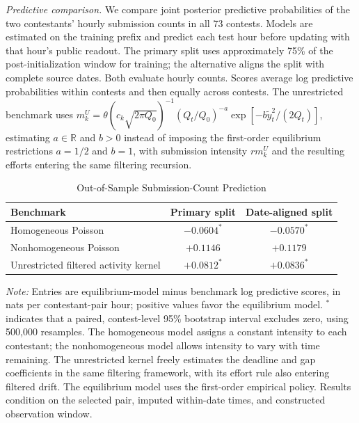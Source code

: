 \documentclass[mnsc]{informs3}
\begin{document}
\begin{APPENDICES}
\textit{Predictive comparison.} We compare joint posterior predictive probabilities of the two contestants' hourly submission counts in all 73 contests. Models are estimated on the training prefix and predict each test hour before updating with that hour's public readout. The primary split uses approximately 75\% of the post-initialization window for training; the alternative aligns the split with complete source dates. Both evaluate hourly counts. Scores average log predictive probabilities within contests and then equally across contests.
The unrestricted benchmark uses $m_k^{U}=\theta(c_k\sqrt{2\pi Q_0})^{-1}(Q_t/Q_0)^{-a}\exp[-b\tilde y_t^2/(2Q_t)]$, estimating $a\in\mathbb R$ and $b>0$ instead of imposing the first-order equilibrium restrictions $a=1/2$ and $b=1$, with submission intensity $rm_k^{U}$ and the resulting efforts entering the same filtering recursion.

\begin{table}[!htbp]
\centering
\caption{Out-of-Sample Submission-Count Prediction}
\label{tab-submission-prediction}
\small
\begin{tabular}{lcc}
\toprule
Benchmark & Primary split & Date-aligned split\\
\midrule
Homogeneous Poisson & $-0.0604^{*}$ & $-0.0570^{*}$\\
Nonhomogeneous Poisson & $+0.1146$ & $+0.1179$\\
Unrestricted filtered activity kernel & $+0.0812^{*}$ & $+0.0836^{*}$\\
\bottomrule
\end{tabular}
\par\vspace{0.5ex}
\begin{minipage}{\textwidth}
\footnotesize\textit{Note:} Entries are equilibrium-model minus benchmark log predictive scores, in nats per contestant-pair hour; positive values favor the equilibrium model. $^{*}$ indicates that a paired, contest-level 95\% bootstrap interval excludes zero, using 500,000 resamples. The homogeneous model assigns a constant intensity to each contestant; the nonhomogeneous model allows intensity to vary with time remaining. The unrestricted kernel freely estimates the deadline and gap coefficients in the same filtering framework, with its effort rule also entering filtered drift. The equilibrium model uses the first-order empirical policy. Results condition on the selected pair, imputed within-date times, and constructed observation window.
\end{minipage}
\end{table}

\end{APPENDICES}
\end{document}
